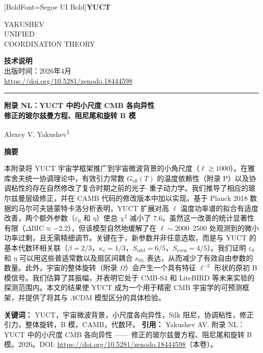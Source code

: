 \documentclass[11pt,a4paper]{article}
\newcommand{\makeheader}{%
	\noindent
	\begin{minipage}{0.17\textwidth}
		\raggedright
		{\fontspec{Segoe UI}[BoldFont=Segoe UI Bold]\bfseries\color{skyblue}\fontsize{46}{46}\selectfont YUCT}%
	\end{minipage}%
	\hspace{30pt}
	\begin{minipage}{0.32\textwidth}
		\raggedright
		{\sffamily\fontsize{11}{13}\selectfont YAKUSHEV\\ UNIFIED\\ COORDINATION THEORY}%
	\end{minipage}%
	\hfill
	\begin{minipage}{0.38\textwidth}
		\raggedleft
		{\sffamily\bfseries 技术说明}\\ 
		{\sffamily 出版时间：2026年4月}\\ 
		{\sffamily\footnotesize \url{https://doi.org/10.5281/zenodo.18444598}}%
	\end{minipage}
	\par\vspace{5pt}
	\noindent\textcolor{gold}{\rule{\textwidth}{1.6pt}}
	\par\vspace{0pt}
}
\begin{document}
	\thispagestyle{firstpage}
	\makeheader
	
	\vspace{0cm}
	{\LARGE\bfseries 附录 NL：YUCT 中的小尺度 CMB 各向异性 \\ 
		\Large 修正的玻尔兹曼方程、阻尼尾和旋转 B 模 \par}
	\vspace{0.2cm}
	
	{\large Alexey V. Yakushev\textsuperscript{1}} \\
	\vspace{0.0cm}
	
	{\color{darkblue}\textbf{\LARGE 摘要}} \par
	{\large
		\noindent
		本附录将 YUCT 宇宙学框架推广到宇宙微波背景的小角尺度（$\ell \gtrsim 1000$）。在雅库舍夫统一协调理论中，有效引力常数 $G_{\mathrm{eff}}(T)$ 的温度依赖性（附录 P）以及协调粘性的存在自然修改了复合时期之前的光子–重子动力学。我们推导了相应的玻尔兹曼层级修正，并在 CAMB 代码的修改版本中加以实现。基于 Planck 2018 数据的马尔可夫链蒙特卡洛分析表明，YUCT 扩展对高 $\ell$ 温度功率谱的拟合有适度改善，两个额外参数（$\varepsilon_0$ 和 $\eta$）使总 $\chi^2$ 减小了 $7.6$。虽然这一改善的统计显著性有限（$\Delta\mathrm{BIC} \approx -2.2$），但该模型自然地缓解了在 $\ell \sim 2000$--$2500$ 处观测到的微小功率过剩，且无需精细调节。关键在于，新参数并非任意选取，而是与 YUCT 的基本代数环相关联（$\beta=2/3$，$\kappa_c=1/3$，$S_{\mathrm{odd}}=6/5$，$S_{\mathrm{even}}=4/5$）。我们证明 $\varepsilon_0$ 和 $\eta$ 可以用这些普适常数以及扇区间耦合 $\kappa_{01}$ 表达，从而减少了有效自由参数的数量。此外，宇宙的整体旋转（附录 $\Omega$）会产生一个具有特征 $\ell^{-2}$ 形状的原初 B 模信号。我们估算了其振幅，并表明它处于 CMB‑S4 和 LiteBIRD 等未来实验的探测范围内。本文的结果使 YUCT 成为一个用于精密 CMB 宇宙学的可预测框架，并提供了将其与 $\Lambda$CDM 模型区分的具体检验。
	}
	
	\vspace{0.1cm}
	\noindent
	{\color{darkblue}\textbf{关键词：}} YUCT，宇宙微波背景，小尺度各向异性，Silk 阻尼，协调粘性，修正引力，整体旋转，B 模，CAMB，代数环。
	\vspace{0.1cm}
	\noindent
	{\color{darkblue}\textbf{引用：}} Yakushev AV. 附录 NL：YUCT 中的小尺度 CMB 各向异性 —— 修正的玻尔兹曼方程、阻尼尾和旋转 B 模。2026。DOI: \url{https://doi.org/10.5281/zenodo.18444598}（本卷）。
	
	\vspace{0.4cm}
	
\end{document}
